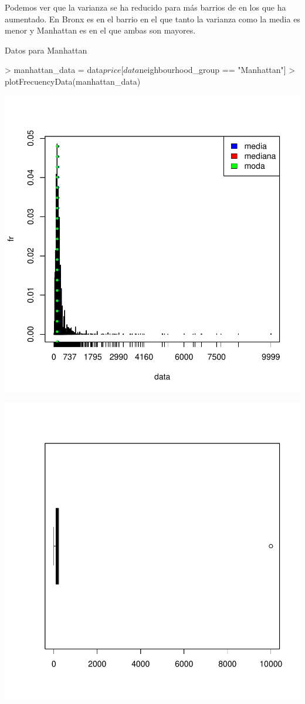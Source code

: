 \documentclass [a4paper] {article}
\begin{document}
Podemos ver que la varianza se ha reducido para más barrios de en los que ha aumentado.
En Bronx es en el barrio en el que tanto la varianza como la media es menor y 
Manhattan es en el que ambas son mayores.

Datos para Manhattan
\begin{center}
\begin{Schunk}
\begin{Sinput}
> manhattan_data = data$price[data$neighbourhood_group == "Manhattan"]
> plotFrecuencyData(manhattan_data)
\end{Sinput}
\end{Schunk}
\includegraphics{entrega-029}
\end{center}
\begin{center}
\includegraphics{entrega-030}
\end{center}
\end{document}
